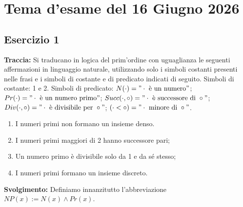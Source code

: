 \chapter{Tema d'esame del 16 Giugno 2026}
\section*{Esercizio 1}
\textbf{Traccia:}
Si traducano in logica del prim'ordine con uguaglianza le seguenti affermazioni in linguaggio naturale, utilizzando solo i simboli costanti presenti nelle frasi e i simboli di costante e di predicato indicati di seguito. Simboli di costante: 1 e 2. Simboli di predicato: $N(\cdot)="\cdot \text{ è un numero}"$; $Pr(\cdot)="\cdot \text{ è un numero primo}"$; $Succ(\cdot,\circ)="\cdot \text{ è successore di } \circ"$; $Div(\cdot,\circ)="\cdot \text{ è divisibile per } \circ"$; $(\cdot < \circ)="\cdot \text{ minore di } \circ"$.
\begin{enumerate}
    \item[(a)] I numeri primi non formano un insieme denso.
    \item[(b)] I numeri primi maggiori di 2 hanno successore pari;
    \item[(c)] Un numero primo è divisibile solo da 1 e da sé stesso;
    \item[(d)] I numeri primi formano un insieme discreto.
\end{enumerate}

\textbf{Svolgimento:}
Definiamo innanzitutto l'abbreviazione $NP(x) := N(x) \land Pr(x)$.


